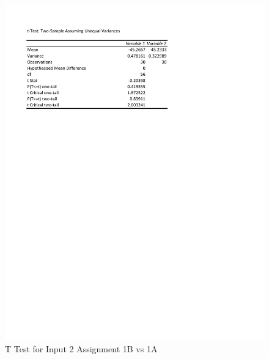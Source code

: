 \documentclass[times]{article}
\begin{document}
	\begin{figure}
		\caption{T Test for Input 2 Assignment 1B vs 1A}
		\label{fig:t_test2}
		\includegraphics[width=\textwidth]{./tests/Input2_t_test.pdf}
	\end{figure}
\end{document}
